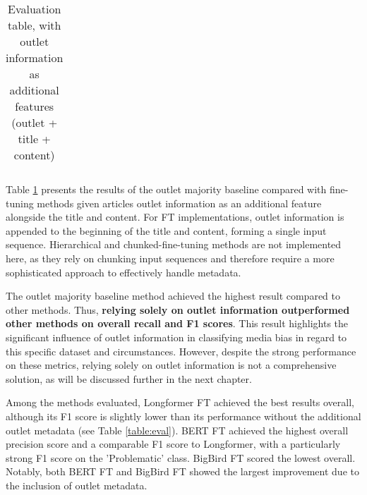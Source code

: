 \begin{table}[htbp]
\begin{tabular}{| c | c | c | c | c |}
    \end{tabular}
    \caption{Evaluation table, with outlet information as additional features (outlet + title + content)}
    \label{table:eval-outlet}
\end{table}

Table \ref{table:eval-outlet} presents the results of the outlet majority baseline compared with fine-tuning methods given articles outlet information as an additional feature alongside the title and content. For FT implementations, outlet information is appended to the beginning of the title and content, forming a single input sequence. Hierarchical and chunked-fine-tuning methods are not implemented here, as they rely on chunking input sequences and therefore require a more sophisticated approach to effectively handle metadata.

The outlet majority baseline method achieved the highest result compared to other methods. Thus, \textbf{relying solely on outlet information outperformed other methods on overall recall and F1 scores}. This result highlights the significant influence of outlet information in classifying media bias in regard to this specific dataset and circumstances. However, despite the strong performance on these metrics, relying solely on outlet information is not a comprehensive solution, as will be discussed further in the next chapter.

Among the methods evaluated, Longformer FT achieved the best results overall, although its F1 score is slightly lower than its performance without the additional outlet metadata (see Table \ref{table:eval}). BERT FT achieved the highest overall precision score and a comparable F1 score to Longformer, with a particularly strong F1 score on the 'Problematic' class. BigBird FT scored the lowest overall. Notably, both BERT FT and BigBird FT showed the largest improvement due to the inclusion of outlet metadata.

